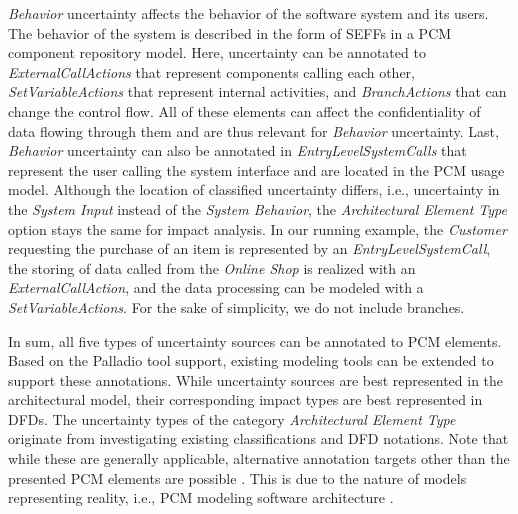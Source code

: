 \emph{Behavior} uncertainty affects the behavior of the software system and its users.
The behavior of the system is described in the form of \acfp{SEFF} in a \ac{PCM} component repository model.
Here, uncertainty can be annotated to \emph{ExternalCallActions} that represent components calling each other, \emph{SetVariableActions} that represent internal activities, and \emph{BranchActions} that can change the control flow.
All of these elements can affect the confidentiality of data flowing through them and are thus relevant for \emph{Behavior} uncertainty.
Last, \emph{Behavior} uncertainty can also be annotated in \emph{EntryLevelSystemCalls} that represent the user calling the system interface and are located in the \ac{PCM} usage model.
Although the location of classified uncertainty differs, i.e., uncertainty in the \emph{System Input} instead of the \emph{System Behavior}, the \emph{Architectural Element Type} option stays the same for impact analysis.
In our running example, the \emph{Customer} requesting the purchase of an item is represented by an \emph{EntryLevelSystemCall}, the storing of data called from the \emph{Online Shop} is realized with an \emph{ExternalCallAction}, and the data processing can be modeled with a \emph{SetVariableActions}.
For the sake of simplicity, we do not include branches.

In sum, all five types of uncertainty sources can be annotated to \ac{PCM} elements.
Based on the Palladio \cite{reussner_palladio_2024} tool support, existing modeling tools can be extended to support these annotations.
While uncertainty sources are best represented in the architectural model, their corresponding impact types are best represented in \acp{DFD}.
The uncertainty types of the category \emph{Architectural Element Type} originate from investigating existing classifications and \ac{DFD} notations.
Note that while these are generally applicable, alternative annotation targets other than the presented \ac{PCM} elements are possible \cite{benkler_architecture-based_2022}.
This is due to the nature of models representing reality, i.e., \ac{PCM} modeling software architecture \cite{stachowiak_allgemeine_1973}.






